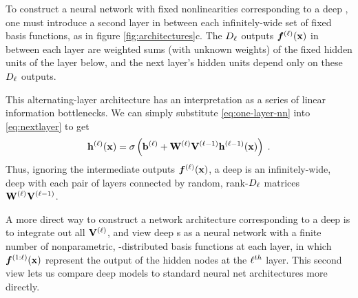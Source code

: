  

To construct a neural network with fixed nonlinearities corresponding to a deep \gp{}, 
one must introduce a second layer in between each infinitely-wide set of fixed basis functions, as in figure \ref{fig:architectures}c.
The $D_\ell$ outputs $\boldsymbol{f}^{(\ell)}({\bf{x}})$ in between each layer are weighted sums (with unknown weights) of the fixed hidden units of the layer below, and the next layer's hidden units depend only on these $D_\ell$ outputs.
%

This alternating-layer architecture has an interpretation as a series of linear information bottlenecks.
We can simply substitute \eqref{eq:one-layer-nn} into \eqref{eq:nextlayer} to get
%
\begin{align}
{\bf{h}}^{(\ell)}({\bf{x}}) = \sigma \left( {\bf{b}}^{(\ell)} + \mathbf{W}^{(\ell)} \mathbf{V}^{(\ell-1)} {\bf{h}}^{(\ell-1)}({\bf{x}}) \right) \;.
\end{align}
%
Thus, ignoring the intermediate outputs $\boldsymbol{f}^{(\ell)}({\bf{x}})$, a deep \gp{} is an infinitely-wide, deep \MLP{} with each pair of layers connected by random, rank-$D_\ell$ matrices $\mathbf{W}^{(\ell)} \mathbf{V}^{(\ell-1)}$. %



A more direct way to construct a network architecture corresponding to a deep \gp{} is to integrate out all $\mathbf{V}^{(\ell)}$, and view deep \gp{}s as a neural network with a finite number of nonparametric, \gp{}-distributed basis functions at each layer, in which $\boldsymbol{f}^{(1:\ell)}({\bf{x}})$ represent the output of the hidden nodes at the $\ell^{th}$ layer.
This second view lets us compare deep \gp{} models to standard neural net architectures more directly.






